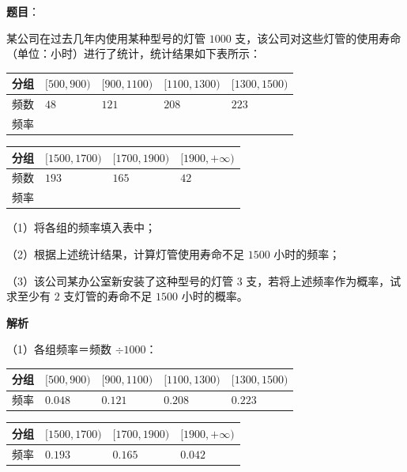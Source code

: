 \begin{answer}

\textbf{题目}：

某公司在过去几年内使用某种型号的灯管 $1000$ 支，该公司对这些灯管的使用寿命（单位：小时）进行了统计，统计结果如下表所示：

\begin{center}
\begin{tabular}{lllll}
\toprule
分组 & $[500,900)$ & $[900,1100)$ & $[1100,1300)$ & $[1300,1500)$ \\
\midrule
频数 & $48$ & $121$ & $208$ & $223$ \\
频率 &  &  &  &  \\
\bottomrule
\end{tabular}
\end{center}

\begin{center}
\begin{tabular}{llll}
\toprule
分组 & $[1500,1700)$ & $[1700,1900)$ & $[1900,+\infty)$ \\
\midrule
频数 & $193$ & $165$ & $42$ \\
频率 &  &  &  \\
\bottomrule
\end{tabular}
\end{center}

（1）将各组的频率填入表中；

（2）根据上述统计结果，计算灯管使用寿命不足 $1500$ 小时的频率；

（3）该公司某办公室新安装了这种型号的灯管 $3$ 支，若将上述频率作为概率，试求至少有 $2$ 支灯管的寿命不足 $1500$ 小时的概率。

\textbf{解析}

（1）各组频率＝频数 $\div1000$：

\begin{center}
\begin{tabular}{lllll}
\toprule
分组 & $[500,900)$ & $[900,1100)$ & $[1100,1300)$ & $[1300,1500)$ \\
\midrule
频率 & $0.048$ & $0.121$ & $0.208$ & $0.223$ \\
\bottomrule
\end{tabular}
\end{center}

\begin{center}
\begin{tabular}{llll}
\toprule
分组 & $[1500,1700)$ & $[1700,1900)$ & $[1900,+\infty)$ \\
\midrule
频率 & $0.193$ & $0.165$ & $0.042$ \\
\bottomrule
\end{tabular}
\end{center}


\end{answer}
